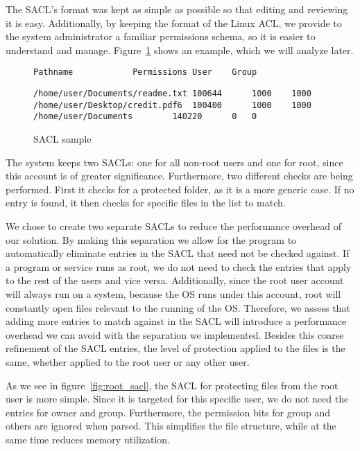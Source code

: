 \par The \ac{SACL}'s format was kept as simple as possible so that editing and reviewing it is easy. Additionally, by keeping the format of the Linux \ac{ACL}, we provide to the system administrator a familiar permissions schema, so it is easier to understand and manage. Figure~\ref{fig:sacl} shows an example, which we will analyze later.

\begin{figure}[ht]
	\centering
	\begin{lstlisting}
Pathname			Permissions	User	Group
	\end{lstlisting}
	\footnotesize{\selectfont 
	\begin{lstlisting}
/home/user/Documents/readme.txt	100644		1000	1000
/home/user/Desktop/credit.pdf6	100400		1000	1000
/home/user/Documents		140220		0	0
	\end{lstlisting}}
	\caption{\ac{SACL} sample}
	\label{fig:sacl}
\end{figure}

\par The system keeps two \acp{SACL}: one for all non-root users and one for root, since this account is of greater significance. Furthermore, two different checks are being performed. First it checks for a protected folder, as it is a more generic case. If no entry is found, it then checks for specific files in the list to match. 

\par We chose to create two separate \acp{SACL} to reduce the performance overhead of our solution. By making this separation we allow for the program to automatically eliminate entries in the \ac{SACL} that need not be checked against. If a program or service runs as root, we do not need to check the entries that apply to the rest of the users and vice versa. Additionally, since the root user account will always run on a system, because the \ac{OS} runs under this account, root will constantly open files relevant to the running of the \ac{OS}. Therefore, we assess that adding more entries to match against in the \ac{SACL} will introduce a performance overhead we can avoid with the separation we implemented. Besides this coarse refinement of the \ac{SACL} entries, the level of protection applied to the files is the same, whether applied to the root user or any other user.

\par As we see in figure~\ref{fig:root_sacl}, the \ac{SACL} for protecting files from the root user is more simple. Since it is targeted for this specific user, we do not need the entries for owner and group. Furthermore, the permission bits for group and others are ignored when parsed. This simplifies the file structure, while at the same time reduces memory utilization.

